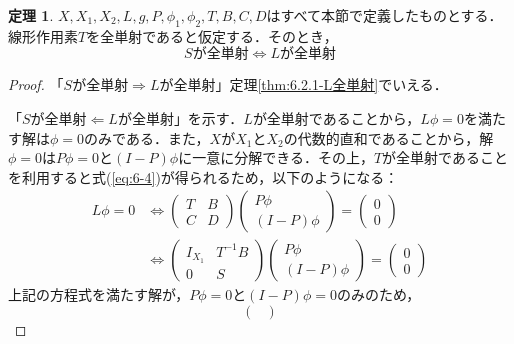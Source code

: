 \documentclass[11pt,a4paper,titlepage]{jsreport}
\theoremstyle{definition}
\newtheorem{thm}{定理}
\begin{document}
\begin{thm}
  $X,X_1,X_2,L,g,P,\phi_1,\phi_2,T,B,C,D$はすべて本節で定義したものとする．線形作用素$T$を全単射であると仮定する．そのとき，
  \begin{equation*}
    Sが全単射 \Leftrightarrow Lが全単射
  \end{equation*}
\end{thm}

\begin{proof}
  「$Sが全単射 \Rightarrow Lが全単射$」定理\ref{thm:6.2.1-L全単射}でいえる．

  「$Sが全単射 \Leftarrow Lが全単射$」を示す．$L$が全単射であることから，$L\phi=0$を満たす解は$\phi = 0$のみである．また，$X$が$X_1$と$X_2$の代数的直和であることから，解$\phi=0$は$P\phi=0$と$(I-P)\phi$に一意に分解できる．その上，$T$が全単射であることを利用すると式(\ref{eq:6-4})が得られるため，以下のようになる：
  \begin{equation*}
    \begin{split}
      L\phi=0 &\Leftrightarrow
      \begin{pmatrix}
        T & B \\
        C & D
      \end{pmatrix}
      \begin{pmatrix}
        P \phi \\
        (I-P) \phi
      \end{pmatrix}
      =
      \begin{pmatrix}
        0 \\
        0
      \end{pmatrix}
      \\&\Leftrightarrow
      \begin{pmatrix}
        I_{X_1} & T^{-1}B \\
        0 & S
      \end{pmatrix}
      \begin{pmatrix}
        P \phi \\
        (I-P) \phi
      \end{pmatrix}
      =
      \begin{pmatrix}
        0 \\
        0
      \end{pmatrix}
    \end{split}
  \end{equation*}
  上記の方程式を満たす解が，$P\phi=0$と$(I-P)\phi=0$のみのため，
  \begin{equation*}
    \begin{pmatrix}

\end{pmatrix}
\end{equation*}
\end{proof}
\end{document}

